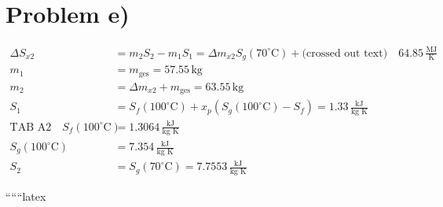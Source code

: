 \section*{Problem e)}

\begin{align*}
    \Delta S_{x2} &= m_2 S_2 - m_1 S_1 = \Delta m_{x2} S_g(70^\circ \text{C}) + \text{(crossed out text)} \quad 64.85 \, \frac{\text{MJ}}{\text{K}} \\
    m_1 &= m_{\text{ges}} = 57.55 \, \text{kg} \\
    m_2 &= \Delta m_{x2} + m_{\text{ges}} = 63.55 \, \text{kg} \\
    S_1 &= S_f(100^\circ \text{C}) + x_p (S_g(100^\circ \text{C}) - S_f) = 1.33 \, \frac{\text{kJ}}{\text{kg K}} \\
    \text{TAB A2} \quad S_f(100^\circ \text{C}) &= 1.3064 \, \frac{\text{kJ}}{\text{kg K}} \\
    S_g(100^\circ \text{C}) &= 7.354 \, \frac{\text{kJ}}{\text{kg K}} \\
    S_2 &= S_g(70^\circ \text{C}) = 7.7553 \, \frac{\text{kJ}}{\text{kg K}}
\end{align*}

``````latex